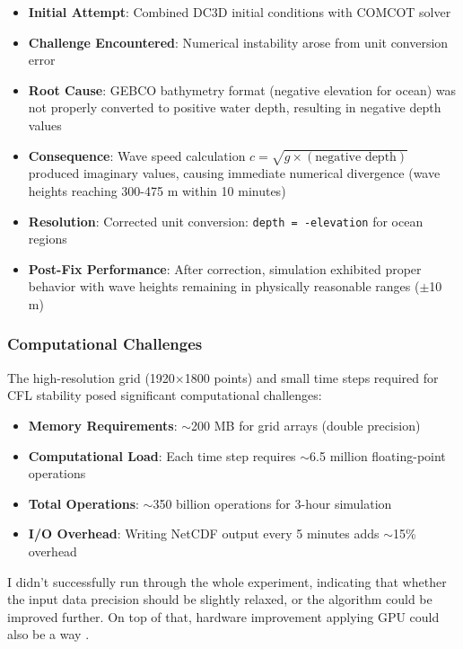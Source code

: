 \documentclass[12pt]{article}
\begin{document}
\begin{itemize}
    \item \textbf{Initial Attempt}: Combined DC3D initial conditions with COMCOT solver
    \item \textbf{Challenge Encountered}: Numerical instability arose from unit conversion error
    \item \textbf{Root Cause}: GEBCO bathymetry format (negative elevation for ocean) was not properly converted to positive water depth, resulting in negative depth values
    \item \textbf{Consequence}: Wave speed calculation $c = \sqrt{g \times (\text{negative depth})}$ produced imaginary values, causing immediate numerical divergence (wave heights reaching 300-475 m within 10 minutes)
    \item \textbf{Resolution}: Corrected unit conversion: \texttt{depth = -elevation} for ocean regions
    \item \textbf{Post-Fix Performance}: After correction, simulation exhibited proper behavior with wave heights remaining in physically reasonable ranges ($\pm$10 m)
\end{itemize}

\subsubsection{Computational Challenges}

The high-resolution grid (1920$\times$1800 points) and small time steps required for CFL stability posed significant computational challenges:

\begin{itemize}
    \item \textbf{Memory Requirements}: $\sim$200 MB for grid arrays (double precision)
    \item \textbf{Computational Load}: Each time step requires $\sim$6.5 million floating-point operations
    \item \textbf{Total Operations}: $\sim$350 billion operations for 3-hour simulation
    \item \textbf{I/O Overhead}: Writing NetCDF output every 5 minutes adds $\sim$15\% overhead
\end{itemize}

I didn't successfully run through the whole experiment, indicating that whether the input data precision should be slightly relaxed, or the algorithm could be improved further. On top of that, hardware improvement applying GPU could also be a way \cite{comcot_gfortran}.
\end{document}
